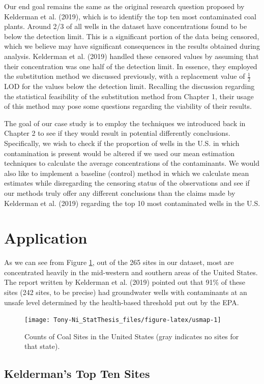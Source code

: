 \documentclass[12pt, twoside]{amherstthesis}
\begin{document}
Our end goal remains the same as the original research question proposed by Kelderman et al. (2019), which is to identify the top ten most contaminated coal plants. Around 2/3 of all wells in the dataset have concentrations found to be below the detection limit. This is a significant portion of the data being censored, which we believe may have significant consequences in the results obtained during analysis. Kelderman et al. (2019) handled these censored values by assuming that their concentration was one half of the detection limit. In essence, they employed the substitution method we discussed previously, with a replacement value of \(\frac{1}{2}\) LOD for the values below the detection limit. Recalling the discussion regarding the statistical feasibility of the substitution method from Chapter 1, their usage of this method may pose some questions regarding the viability of their results.

The goal of our case study is to employ the techniques we introduced back in Chapter 2 to see if they would result in potential differently conclusions. Specifically, we wish to check if the proportion of wells in the U.S. in which contamination is present would be altered if we used our mean estimation techniques to calculate the average concentrations of the contaminants. We would also like to implement a baseline (control) method in which we calculate mean estimates while disregarding the censoring status of the observations and see if our methods truly offer any different conclusions than the claims made by Kelderman et al. (2019) regarding the top 10 most contaminated wells in the U.S.

\hypertarget{application}{%
\section{Application}\label{application}}

As we can see from Figure \ref{fig:usmap}, out of the 265 sites in our dataset, most are concentrated heavily in the mid-western and southern areas of the United States. The report written by Kelderman et al. (2019) pointed out that 91\% of these sites (242 sites, to be precise) had groundwater wells with contaminants at an unsafe level determined by the health-based threshold put out by the EPA.
\begin{figure}

{\centering \texttt{[image: Tony-Ni\_StatThesis\_files/figure-latex/usmap-1]} 

}

\caption{Counts of Coal Sites in the United States (gray indicates no sites for that state).}\label{fig:usmap}
\end{figure}
\hypertarget{keldermans-top-ten-sites}{%
\subsection{Kelderman's Top Ten Sites}\label{keldermans-top-ten-sites}}
\end{document}
